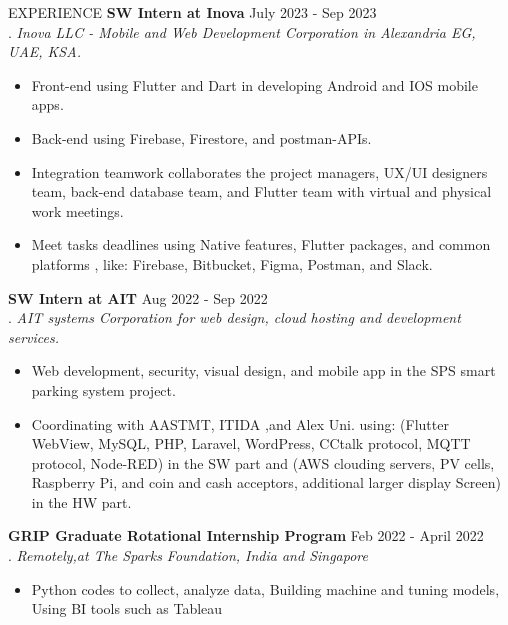 \documentclass{resume} %
\begin{document}


 \begin{rSection}{EXPERIENCE}
 \textbf{SW Intern at Inova} \hfill  July 2023 - Sep 2023\\
  .	 \hfill \textit{Inova LLC - Mobile and Web Development Corporation in Alexandria EG, UAE, KSA.}
  \begin{itemize}
     \itemsep -3pt {} 
      \item Front-end using Flutter and Dart in developing Android and IOS mobile apps.
      \item Back-end using Firebase, Firestore, and postman-APIs.
      \item Integration teamwork collaborates the project managers, UX/UI designers team, back-end database team, and Flutter team with virtual and physical work meetings.
      \item  Meet tasks deadlines using Native features, Flutter packages, and common platforms , like: Firebase, Bitbucket, Figma, Postman, and Slack.
 \end{itemize}

 \textbf{SW Intern at AIT} \hfill  Aug 2022 - Sep 2022\\
  .	 \hfill \textit{AIT systems Corporation for web design, cloud hosting and development services.}
  \begin{itemize}
     \itemsep -3pt {} 
      \item Web development, security, visual design, and mobile app in the SPS smart parking system project.
      \item Coordinating with AASTMT, ITIDA ,and Alex Uni. using: (Flutter WebView, MySQL, PHP, Laravel, WordPress, CCtalk protocol, MQTT protocol, Node-RED) in the SW part and (AWS clouding servers, PV cells, Raspberry Pi, and coin and cash acceptors, additional larger display Screen) in the HW part.
 \end{itemize}


 \textbf{GRIP Graduate Rotational Internship Program} \hfill  Feb 2022 - April 2022\\
  .	 \hfill \textit{Remotely,at The Sparks Foundation, India and Singapore}
  \begin{itemize}
     \itemsep -3pt {} 
      \item Python codes to collect, analyze data, Building machine and tuning models, Using BI tools such as Tableau
 \end{itemize}
 

\end{rSection}
\end{document}
